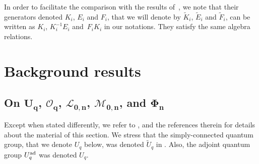 \documentclass[pdftex]{sigma}
\numberwithin{equation}{section}
\theoremstyle{definition}
\newcommand{\Ll}{{\mathcal L}}
\newcommand{\Mm}{{\mathcal M}}
\newcommand{\Oo}{{\mathcal O}}
\begin{document}
In order to facilitate the comparison with the results of~\cite{DC-L}, we note that their generators denoted $K_i$, $E_i$ and $F_i$, that we will denote by $\tilde{K}_i$, $\tilde{E}_i$ and $\tilde{F}_i$, can be written as $K_i$, $K_i^{-1}E_i$ and~$F_iK_i$ in our notations. They satisfy the same algebra relations.

\section{Background results}\label{PREL}

\subsection[On U\_q, O\_q, L\_{0,n}, M\_{0,n}, and Phi\_n]{On $\boldsymbol{U_q}$, $\boldsymbol{\Oo_q}$, $\boldsymbol{\Ll_{0,n}}$, $\boldsymbol{\Mm_{0,n}}$, and $\boldsymbol{\Phi_n}$}\label{ALGdef}
Except when stated differently, we refer to \cite[Sections 2--4 and 6]{BR}, and the references therein for details about the material of this section. We stress that the simply-connected quantum group, that we denote $U_q$ below, was denoted $\tilde U_q$ in \cite{BR}. Also, the adjoint quantum group $U_q^{\rm ad}$ was denoted $U_q$.
\end{document}

